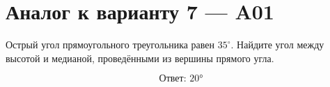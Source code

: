 


\section*{Аналог к варианту 7 — A01}
Острый угол прямоугольного треугольника равен \(35^\circ\). Найдите угол между высотой и медианой, проведёнными из вершины прямого угла.
\begin{center}\end{center}
\[\boxed{\text{Ответ: }20°}\]

